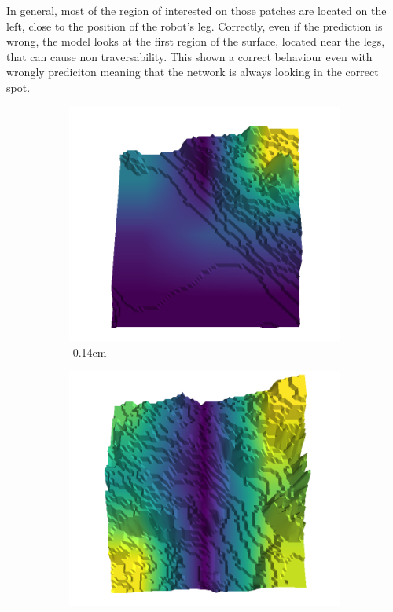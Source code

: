 \documentclass[../document.tex]{subfiles}
\begin{document}
In general, most of the region of interested on those patches are located on the left, close to the position of the robot's leg. Correctly, even if the prediction is wrong, the model looks at the first region of the surface, located near the legs, that can cause non traversability. This shown a correct behaviour even with wrongly prediciton meaning that the network is always looking in the correct spot. 
\begin{figure}[H]
\centering
\begin{subfigure}[b]{0.192\linewidth}
\includegraphics[width=\linewidth]{../img/5/quarry/false_negative/-14-patch-3d-majavi-colormap-0.png}
\caption{-0.14cm}
\label{fig : quarry-false_negative-0}
\end{subfigure}
\begin{subfigure}[b]{0.192\linewidth}
\includegraphics[width=\linewidth]{../img/5/quarry/false_negative/-6-patch-3d-majavi-colormap-10.png}

\end{subfigure}
\end{figure}
\end{document}
